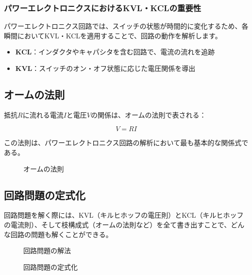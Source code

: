 \subsubsection{パワーエレクトロニクスにおけるKVL・KCLの重要性}

パワーエレクトロニクス回路では、スイッチの状態が時間的に変化するため、各瞬間においてKVL・KCLを適用することで、回路の動作を解析します。

\begin{itemize}
\item \textbf{KCL}：インダクタやキャパシタを含む回路で、電流の流れを追跡
\item \textbf{KVL}：スイッチのオン・オフ状態に応じた電圧関係を導出
\end{itemize}

\subsection{オームの法則}

抵抗$R$に流れる電流$I$と電圧$V$の関係は、オームの法則で表される：

\begin{equation}
V = RI
\end{equation}

この法則は、パワーエレクトロニクス回路の解析において最も基本的な関係式である。

\begin{figure}[H]
\centering
{}
\caption{オームの法則}
\label{fig:ohms_law}
\end{figure}

\subsection{回路問題の定式化}

回路問題を解く際には、KVL（キルヒホッフの電圧則）とKCL（キルヒホッフの電流則）、そして枝構成式（オームの法則など）を全て書き出すことで、どんな回路の問題も解くことができる。

\begin{figure}[H]
\centering
{}
\caption{回路問題の解法}
\label{fig:circuit_solution}
\end{figure}

\begin{figure}[H]
\centering
{}
\caption{回路問題の定式化}
\label{fig:circuit_formulation}
\end{figure}

